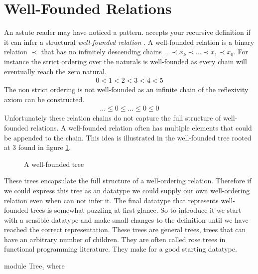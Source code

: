 \documentclass[./Thesis.tex]{subfiles}
\begin{document}
\section{Well-Founded Relations}
\label{sec:well-founded-relations}
An astute reader may have noticed a pattern. \Agda{} accepts your recursive
definition if it can infer a structural \textit{well-founded relation}
\cite{soare}. A well-founded relation is a binary relation $\prec$ that has no
infinitely descending chains $\dots \prec x_k \prec \dots \prec x_1 \prec x_0$.
For instance the strict ordering over the naturals is well-founded
as every chain will eventually reach the zero natural.
\begin{align}
  \label{eqn:wellfounded-natural}
  0 < 1 < 2 < 3 < 4 < 5
\end{align}
The non strict ordering is not well-founded as an infinite chain of the
reflexivity axiom can be constructed.
\begin{align}
  \label{eqn:non-wellfounded-natural}
  \dots \leq 0 \leq \dots \leq 0 \leq 0
\end{align}
Unfortunately these relation chains do not capture the full structure of well-founded
relations. A well-founded relation often has multiple elements that could be
appended to the chain. This idea is illustrated in the well-founded tree
rooted at 3 found in figure \ref{fig:wellfounded-tree}.
\begin{figure}[h]
  \centering
  \caption{A well-founded tree }
  \label{fig:wellfounded-tree}
\end{figure}
These trees encapsulate the full structure of a well-ordering relation.
Therefore if we could express this tree as an \Agda{} datatype we could supply
our own well-ordering relation even when \Agda{} can not infer it. The final
datatype that represents well-founded trees is somewhat puzzling at first
glance. So to introduce it we start with a sensible datatype and make small
changes to the definition until we have reached the correct representation.
These trees are general trees, trees that can have an arbitrary number
of children. They are often called rose trees in functional programming
literature. They make for a good starting datatype.
\begin{code}[hide]
  module Tree₁ where
\end{code}
\end{document}
